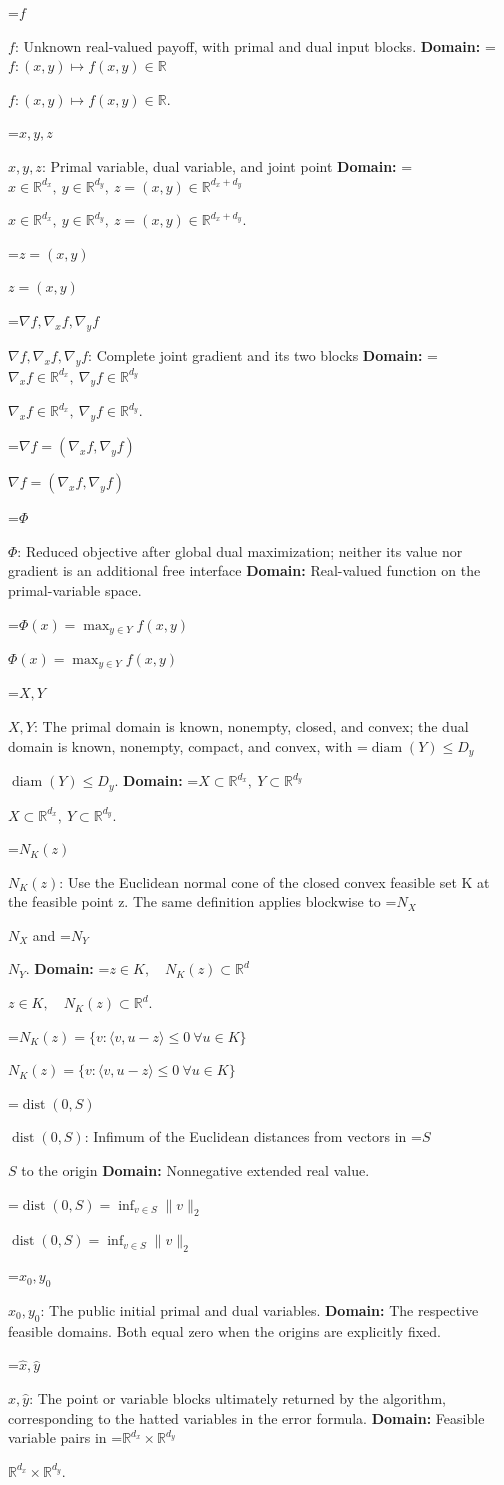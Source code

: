 \documentclass[10pt,a4paper]{article}
\newcommand{\AtlasMath}[1]{\par\begingroup\centering\setbox0=\hbox{$\displaystyle #1$}\ifdim\wd0>1.4\linewidth\typeout{ATLAS WIDE FORMULA: \the\wd0}\fi\ifdim\wd0>\linewidth\resizebox{\linewidth}{!}{\box0}\else\box0\fi\par\endgroup}
\newcommand{\AtlasInlineMath}[1]{\begingroup\setbox0=\hbox{$#1$}\ifdim\wd0>.4\linewidth\endgroup\AtlasMath{#1}\else\endgroup$#1$\fi}
\begin{document}
\AtlasInlineMath{f}: Unknown real-valued payoff, with primal and dual input blocks. \textbf{Domain:} \AtlasInlineMath{f:(x,y)\mapsto f(x,y)\in\mathbb R}.

\AtlasInlineMath{x,y,z}: Primal variable, dual variable, and joint point \textbf{Domain:} \AtlasInlineMath{x\in\mathbb R^{d_x},\ y\in\mathbb R^{d_y},\ z=(x,y)\in\mathbb R^{d_x+d_y}}.

\AtlasInlineMath{z=(x,y)}

\AtlasInlineMath{\nabla f,\nabla_x f,\nabla_y f}: Complete joint gradient and its two blocks \textbf{Domain:} \AtlasInlineMath{\nabla_x f\in\mathbb R^{d_x},\ \nabla_y f\in\mathbb R^{d_y}}.

\AtlasInlineMath{\nabla f=(\nabla_x f,\nabla_y f)}

\AtlasInlineMath{\Phi}: Reduced objective after global dual maximization; neither its value nor gradient is an additional free interface \textbf{Domain:} Real-valued function on the primal-variable space.

\AtlasInlineMath{\Phi(x)=\max_{y\in Y}f(x,y)}

\AtlasInlineMath{X,Y}: The primal domain is known, nonempty, closed, and convex; the dual domain is known, nonempty, compact, and convex, with \AtlasInlineMath{\operatorname{diam}(Y)\le D_y}. \textbf{Domain:} \AtlasInlineMath{X\subset\mathbb R^{d_x},\ Y\subset\mathbb R^{d_y}}.

\AtlasInlineMath{N_K(z)}: Use the Euclidean normal cone of the closed convex feasible set K at the feasible point z. The same definition applies blockwise to \AtlasInlineMath{N_X} and \AtlasInlineMath{N_Y}. \textbf{Domain:} \AtlasInlineMath{z\in K,\quad N_K(z)\subset\mathbb R^d}.

\AtlasInlineMath{N_K(z)=\{v:\langle v,u-z\rangle\le0\ \forall u\in K\}}

\AtlasInlineMath{\operatorname{dist}(0,S)}: Infimum of the Euclidean distances from vectors in \AtlasInlineMath{S} to the origin \textbf{Domain:} Nonnegative extended real value.

\AtlasInlineMath{\operatorname{dist}(0,S)=\inf_{v\in S}\|v\|_2}

\AtlasInlineMath{x_0,y_0}: The public initial primal and dual variables. \textbf{Domain:} The respective feasible domains. Both equal zero when the origins are explicitly fixed.

\AtlasInlineMath{\widehat x,\widehat y}: The point or variable blocks ultimately returned by the algorithm, corresponding to the hatted variables in the error formula. \textbf{Domain:} Feasible variable pairs in \AtlasInlineMath{\mathbb R^{d_x}\times\mathbb R^{d_y}}.
\end{document}
